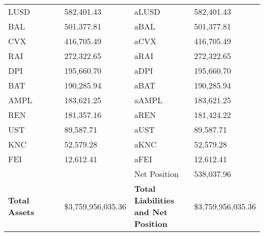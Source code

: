 \begin{longtable}{@{}p{0.25\linewidth}p{0.25\linewidth}p{0.25\linewidth}p{0.25\linewidth}@{}}
LUSD & 582,401.43 & aLUSD & 582,401.43 \\
BAL & 501,377.81 & aBAL & 501,377.81 \\
CVX & 416,705.49 & aCVX & 416,705.49 \\
RAI & 272,322.65 & aRAI & 272,322.65 \\
DPI & 195,660.70 & aDPI & 195,660.70 \\
BAT & 190,285.94 & aBAT & 190,285.94 \\
AMPL & 183,621.25 & aAMPL & 183,621.25 \\
REN & 181,357.16 & aREN & 181,424.22 \\
UST & 89,587.71 & aUST & 89,587.71 \\
KNC & 52,579.28 & aKNC & 52,579.28 \\
FEI & 12,612.41 & aFEI & 12,612.41 \\
 &  & Net Position & 538,037.96 \\

\midrule

\textbf{Total Assets} & \$3,759,956,035.36 & \textbf{Total Liabilities and Net Position} & \$3,759,956,035.36 \\

\bottomrule

\end{longtable}
